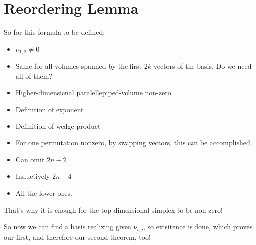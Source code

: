 \documentclass[12pt,a4paper]{scrartcl}
\begin{document}

\section{Reordering Lemma}

So for this formula to be defined:

\begin{itemize}
  \item \( \nu_{1,2} \neq 0 \)
  \item Same for all volumes spanned by the first \( 2k \) vectors of the basis. Do we need all of them?
  \item Higher-dimensional paralellepiped-volume non-zero
  \item Definition of exponent
  \item Definition of wedge-product
  \item For one permutation nonzero, by swapping vectors, this can be accomplished.
  \item Can omit \( 2n-2 \)
  \item Inductively \( 2n-4 \)
  \item All the lower ones.
\end{itemize}

That's why it is enough for the top-dimensional simplex to be non-zero!

So now we can find a basis realizing given \( \nu_{i,j} \), so exisitence is done, which proves our first, and therefore our second theorem, too!


\endgroup
\end{document}
